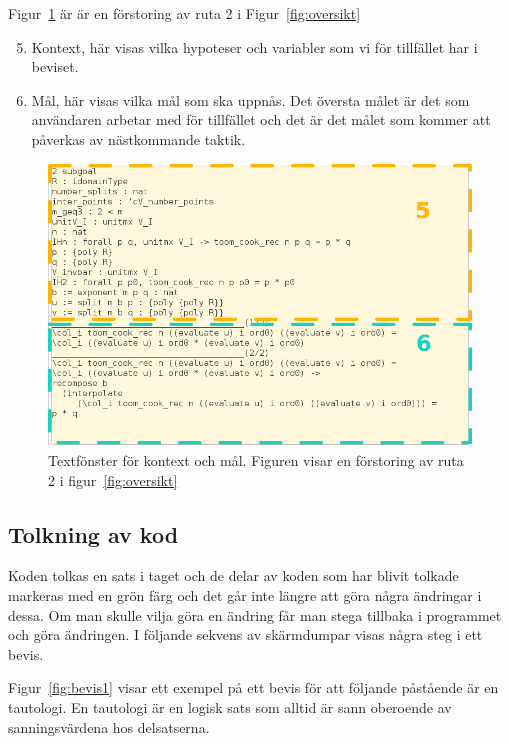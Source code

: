 Figur~\ref{fig:kontext} är är en förstoring av ruta 2 i Figur~\ref{fig:oversikt}
\begin{enumerate}
  \setcounter{enumi}{4}
\item Kontext, här visas vilka hypoteser och variabler som vi för tillfället
  har i beviset.
\item Mål, här visas vilka mål som ska uppnås. Det översta målet är det som
  användaren arbetar med för tillfället och det är det målet som kommer att
  påverkas av nästkommande taktik.
\end{enumerate}

\begin{figure}[H]
  \centering
  \includegraphics[width=\textwidth]{images/Kontext}
  \caption[Fönster för kontext och mål]
   {Textfönster för kontext och mål. Figuren visar en förstoring av ruta 2 i
    figur~\ref{fig:oversikt}}
  \label{fig:kontext}
\end{figure}

\subsection{Tolkning av kod}
Koden tolkas en sats i taget och de delar av koden som har blivit tolkade
markeras med en grön färg och det går inte längre att göra några ändringar i
dessa. Om man skulle vilja göra en ändring får man stega tillbaka i programmet
och göra ändringen. I följande sekvens av skärmdumpar visas några steg i ett
bevis.

Figur~\ref{fig:bevis1} visar ett exempel på ett bevis för att följande
påstående är en tautologi. En tautologi är en logisk sats som alltid är sann
oberoende av sanningsvärdena hos delsatserna.

